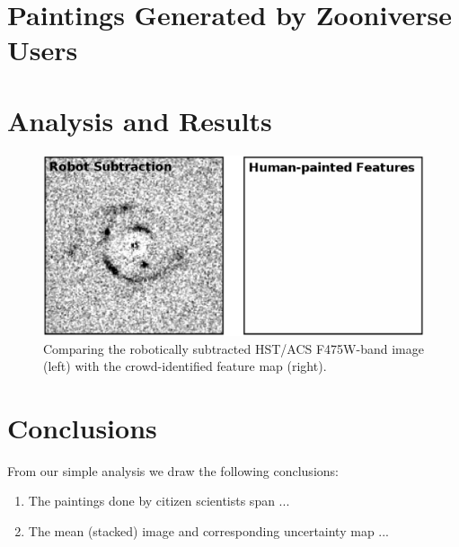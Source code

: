 \documentclass[useAMS,usenatbib]{mn2e}
\begin{document}

\section{Paintings Generated by Zooniverse Users}
\label{sect:data}




\section{Analysis and Results}
\label{sect:results}

\begin{figure}
\begin{center}
\centering\includegraphics[width=\linewidth]{figs/machine-vs-painting_ds9.eps} 
\caption{Comparing the robotically subtracted HST/ACS F475W-band image (left) 
with the crowd-identified feature map (right).}
\label{fig:machine-vs-crowd}
\end{center}
\end{figure}



\section{Conclusions}
\label{sect:concl}

From our simple analysis we draw the following conclusions:

\begin{enumerate}

\item The paintings done by citizen scientists span ... 

\item The mean (stacked) image and corresponding uncertainty map ... 

\end{enumerate}
\end{document}
